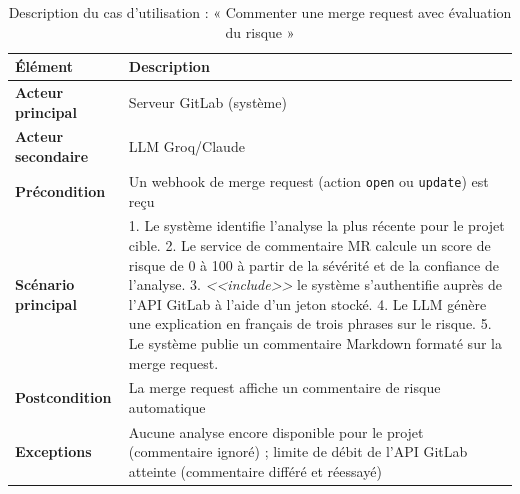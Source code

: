 \documentclass[12pt,a4paper,oneside]{report}
\begin{document}
\begin{table}[H]\centering
\caption{Description du cas d'utilisation : « Commenter une merge request avec évaluation du risque »}\label{tab:uc4}
\renewcommand{\arraystretch}{1.3}
\begin{tabularx}{\textwidth}{>{\bfseries\color{primary}}p{3.2cm} Y}
\toprule
{} Élément & Description \\
\midrule
Acteur principal & Serveur GitLab (système) \\
Acteur secondaire & LLM Groq/Claude \\
Précondition & Un webhook de merge request (action \texttt{open} ou \texttt{update}) est reçu \\
Scénario principal & 1. Le système identifie l'analyse la plus récente pour le projet cible. 2. Le service de commentaire MR calcule un score de risque de 0 à 100 à partir de la sévérité et de la confiance de l'analyse. 3. \emph{<<include>>} le système s'authentifie auprès de l'API GitLab à l'aide d'un jeton stocké. 4. Le LLM génère une explication en français de trois phrases sur le risque. 5. Le système publie un commentaire Markdown formaté sur la merge request. \\
Postcondition & La merge request affiche un commentaire de risque automatique \\
Exceptions & Aucune analyse encore disponible pour le projet (commentaire ignoré) ; limite de débit de l'API GitLab atteinte (commentaire différé et réessayé) \\
\bottomrule
\end{tabularx}
\end{table}
\end{document}
